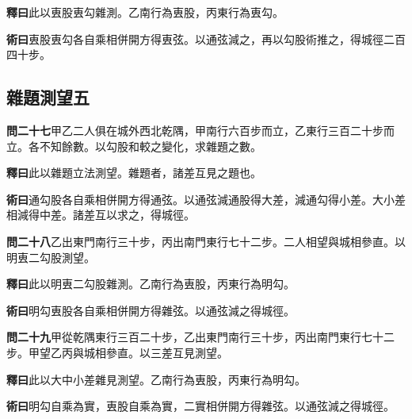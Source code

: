 \documentclass[12pt,a4paper]{article}
\newcommand{\Section}[1]{\subsection*{#1}}
\begin{document}
\vspace{0.3em}

\noindent\textbf{釋曰}\quad 此以叀股叀勾雜測。乙南行為叀股，丙東行為叀勾。

\vspace{0.3em}

\noindent\textbf{術曰}\quad 叀股叀勾各自乘相併開方得叀弦。以通弦減之，再以勾股術推之，得城徑二百四十步。

\Section{雜題測望五}

\noindent\textbf{問二十七}\quad 甲乙二人俱在城外西北乾隅，甲南行六百步而立，乙東行三百二十步而立。各不知餘數。以勾股和較之變化，求雜題之數。

\vspace{0.3em}

\noindent\textbf{釋曰}\quad 此以雜題立法測望。雜題者，諸差互見之題也。

\vspace{0.3em}

\noindent\textbf{術曰}\quad 通勾股各自乘相併開方得通弦。以通弦減通股得大差，減通勾得小差。大小差相減得中差。諸差互以求之，得城徑。

\vspace{0.5em}

\noindent\textbf{問二十八}\quad 乙出東門南行三十步，丙出南門東行七十二步。二人相望與城相參直。以明叀二勾股測望。

\vspace{0.3em}

\noindent\textbf{釋曰}\quad 此以明叀二勾股雜測。乙南行為叀股，丙東行為明勾。

\vspace{0.3em}

\noindent\textbf{術曰}\quad 明勾叀股各自乘相併開方得雜弦。以通弦減之得城徑。

\vspace{0.5em}

\noindent\textbf{問二十九}\quad 甲從乾隅東行三百二十步，乙出東門南行三十步，丙出南門東行七十二步。甲望乙丙與城相參直。以三差互見測望。

\vspace{0.3em}

\noindent\textbf{釋曰}\quad 此以大中小差雜見測望。乙南行為叀股，丙東行為明勾。

\vspace{0.3em}

\noindent\textbf{術曰}\quad 明勾自乘為實，叀股自乘為實，二實相併開方得雜弦。以通弦減之得城徑。
\end{document}
